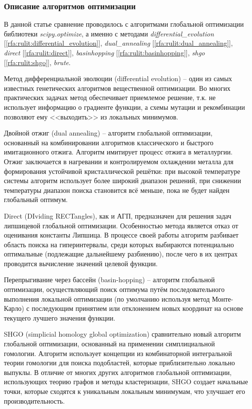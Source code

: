 \documentclass[a4paper,12pt,russian]{article}
\begin{document}
\subsubsection{Описание алгоритмов оптимизации}

В данной статье сравнение проводилось с алгоритмами глобальной оптимизации библиотеки \textit{scipy.optimize}, а именно с методами \textit{differential\_evolution} [\ref{rfa:rulit:differential_evolution}], \textit{dual\_annealing} [\ref{rfa:rulit:dual_annealing}], \textit{direct} [\ref{rfa:rulit:direct}], \textit{basinhopping} [\ref{rfa:rulit:basinhopping}], \textit{shgo} [\ref{rfa:rulit:shgo}], \textit{brute}.

Метод дифференциальной эволюции (differential evolution) -- один из самых известных генетических алгоритмов вещественной оптимизации. Во многих практических задачах метод обеспечивает приемлемое решение, т.к. не использует информацию о градиенте функции, а схемы мутации и рекомбинации позволяют ему <<выходить>> из локальных минимумов.

Двойной отжиг (dual annealing) -- алгоритм глобальной оптимизации, основанный на комбинировании алгоритмов классического и быстрого имитационного отжига. Алгоритм имитирует процесс отжига в металлургии. Отжиг заключается в нагревании и контролируемом охлаждении металла для формирования устойчивой кристаллической решётки: при высокой температуре системы алгоритм использует более широкий диапазон решений, при снижении температуры диапазон поиска становится всё меньше, пока не будет найден глобальный оптимум.

Direct (DIviding RECTangles), как и АГП, предназначен для решения задач липшицевой глобальной оптимизации. Особенностью метода является отказ от оценивания константы Липшица. В процессе своей работы алгоритм разбивает область поиска на гиперинтервалы, среди которых выбираются потенциально оптимальные (подлежащие дальнейшему разбиению), после чего в их центрах проводится вычисление значений целевой функции.

Перепрыгивание через бассейн (basin-hopping) -- алгоритм глобальной оптимизации, осуществляющий поиск оптимума путём последовательного выполнения локальной оптимизации (по умолчанию используя метод Монте-Карло) с последующим принятием или отклонением новых координат на основе текущего лучшего значения функции.

SHGO (simplicial homology global optimization) сравнительно новый алгоритм глобальной оптимизации, основанный на применении симплициальной гомологии. Алгоритм использует концепции из комбинаторной интегральной теории гомологии для поиска подобластей, которые приблизительно локально выпуклы. В отличие от многих других алгоритмов глобальной оптимизации, использующих теорию графов и методы кластеризации, SHGO создает начальные точки, которые сходятся к уникальным локальным минимумам, что улучшает его производительность.
\end{document}
